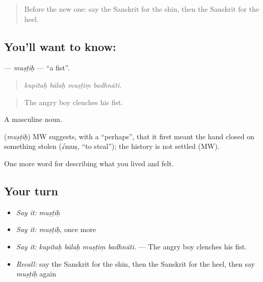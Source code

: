 \label{lesson:SA-C473-mustih}



\begin{quote}
Before the new one: say the Sanskrit for the shin, then the Sanskrit for the heel.
\end{quote}

\subsection*{You'll want to know: }
\textbf{} — \emph{muṣṭiḥ} — \textquotedblleft{}a fist\textquotedblright{}.

\begin{quote}
   
\end{quote}

\begin{quote}
\emph{kupitaḥ bālaḥ muṣṭiṃ badhnāti.}
\end{quote}

\begin{quote}
The angry boy clenches his fist.
\end{quote}

A masculine noun.

\begin{cousinweb}
\textbf{} (\emph{muṣṭiḥ}) MW suggests, with a \textquotedblleft{}perhaps\textquotedblright{}, that it first meant the hand closed on something stolen (√muṣ, \textquotedblleft{}to steal\textquotedblright{}); the history is not settled (MW).
\end{cousinweb}

\begin{grammarlens}[title={What you've built}]
One more word for describing what you lived and felt.
\end{grammarlens}

\subsection*{Your turn}
\begin{itemize}
\raggedright
  \item \emph{Say it:} \emph{muṣṭiḥ}
  \item \emph{Say it:} \emph{muṣṭiḥ}, once more
  \item \emph{Say it:} \emph{kupitaḥ bālaḥ muṣṭiṃ badhnāti.} — The angry boy clenches his fist.
  \item \emph{Recall:} say the Sanskrit for the shin, then the Sanskrit for the heel, then say \emph{muṣṭiḥ} again
\end{itemize}


